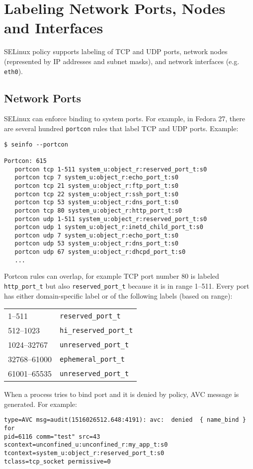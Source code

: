 \section{Labeling Network Ports, Nodes and Interfaces}
SELinux policy supports labeling of TCP and UDP ports, network nodes
(represented by IP addresses and subnet masks), and network interfaces (e.g.
\texttt{eth0}).

\subsection{Network Ports}
SELinux can enforce binding to system ports. For example, in Fedora 27, there
are several hundred \texttt{portcon} rules that label TCP and UDP ports.
Example:
\begin{lstlisting}
$ seinfo --portcon

Portcon: 615
   portcon tcp 1-511 system_u:object_r:reserved_port_t:s0
   portcon tcp 7 system_u:object_r:echo_port_t:s0
   portcon tcp 21 system_u:object_r:ftp_port_t:s0
   portcon tcp 22 system_u:object_r:ssh_port_t:s0
   portcon tcp 53 system_u:object_r:dns_port_t:s0
   portcon tcp 80 system_u:object_r:http_port_t:s0
   portcon udp 1-511 system_u:object_r:reserved_port_t:s0
   portcon udp 1 system_u:object_r:inetd_child_port_t:s0
   portcon udp 7 system_u:object_r:echo_port_t:s0
   portcon udp 53 system_u:object_r:dns_port_t:s0
   portcon udp 67 system_u:object_r:dhcpd_port_t:s0
   ...
\end{lstlisting}
Portcon rules can overlap, for example TCP port number 80 is labeled
\texttt{http\_port\_t} but also \texttt{reserved\_port\_t} because it is in range
1--511. Every port has either domain-specific label or of the following labels
(based on range):

\begin{tabular}{l l}
    1--511 & \texttt{reserved\_port\_t} \\
    512--1023 & \texttt{hi\_reserved\_port\_t} \\
    1024--32767 & \texttt{unreserved\_port\_t} \\
    32768--61000 & \texttt{ephemeral\_port\_t} \\
    61001--65535 & \texttt{unreserved\_port\_t} \\
\end{tabular}

When a process tries to bind port and it is denied by policy, AVC message is
generated. For example:
\begin{lstlisting}
type=AVC msg=audit(1516026512.648:4191): avc:  denied  { name_bind } for
pid=6116 comm="test" src=43 scontext=unconfined_u:unconfined_r:my_app_t:s0
tcontext=system_u:object_r:reserved_port_t:s0
tclass=tcp_socket permissive=0
\end{lstlisting}

